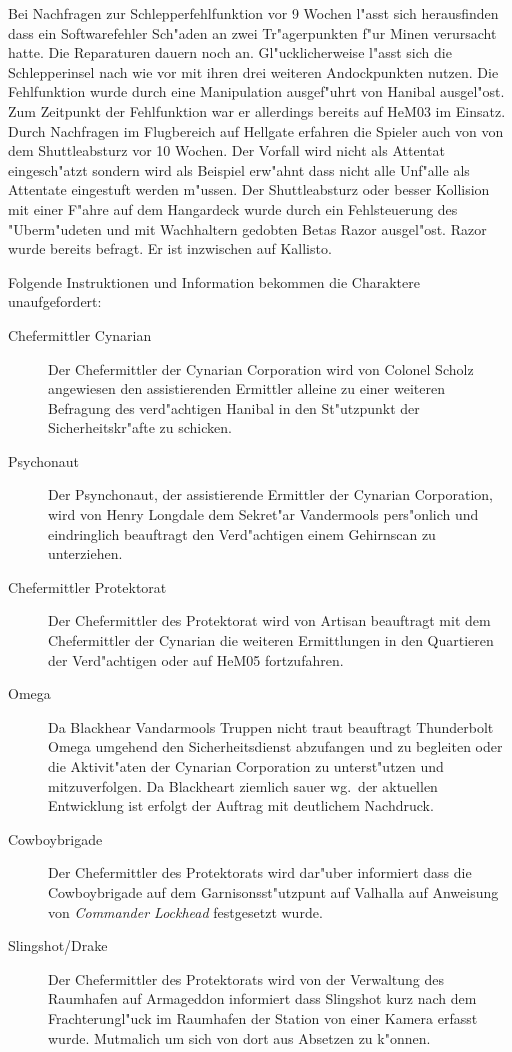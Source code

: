 Bei Nachfragen zur Schlepperfehlfunktion vor 9 Wochen l"asst sich herausfinden dass ein Softwarefehler Sch"aden an zwei Tr"agerpunkten f"ur Minen verursacht hatte. Die Reparaturen dauern noch an. Gl"ucklicherweise l"asst sich die Schlepperinsel nach wie vor mit ihren drei weiteren Andockpunkten nutzen. Die Fehlfunktion wurde durch eine Manipulation ausgef"uhrt von Hanibal ausgel"ost. Zum Zeitpunkt der Fehlfunktion war er allerdings bereits auf HeM03 im Einsatz. Durch Nachfragen im Flugbereich auf Hellgate erfahren die Spieler auch von von dem Shuttleabsturz vor 10 Wochen. Der Vorfall wird nicht als Attentat eingesch"atzt sondern wird als Beispiel erw"ahnt dass nicht alle Unf"alle als Attentate eingestuft werden m"ussen. Der Shuttleabsturz oder besser Kollision mit einer F"ahre auf dem Hangardeck wurde durch ein Fehlsteuerung des "Uberm"udeten und mit Wachhaltern gedobten Betas Razor ausgel"ost. Razor wurde bereits befragt. Er ist inzwischen auf Kallisto.

Folgende Instruktionen und Information bekommen die Charaktere unaufgefordert:

\begin{description}
	\item[Chefermittler Cynarian] Der Chefermittler der Cynarian Corporation wird von Colonel Scholz angewiesen den assistierenden Ermittler alleine zu einer weiteren Befragung des verd"achtigen Hanibal in den St"utzpunkt der Sicherheitskr"afte zu schicken.
	\item[Psychonaut] Der Psynchonaut, der assistierende Ermittler der Cynarian Corporation, wird von Henry Longdale dem Sekret"ar Vandermools pers"onlich und eindringlich beauftragt den Verd"achtigen einem Gehirnscan zu unterziehen.
	\item[Chefermittler Protektorat] Der Chefermittler des Protektorat wird von Artisan beauftragt mit dem Chefermittler der Cynarian die weiteren Ermittlungen in den Quartieren der Verd"achtigen oder auf HeM05 fortzufahren.
	\item[Omega] Da Blackhear Vandarmools Truppen nicht traut beauftragt Thunderbolt  Omega umgehend den Sicherheitsdienst abzufangen und zu begleiten oder die Aktivit"aten der Cynarian Corporation zu unterst"utzen und mitzuverfolgen. Da Blackheart ziemlich sauer wg.~der aktuellen Entwicklung ist erfolgt der Auftrag mit deutlichem Nachdruck.	
	\item[Cowboybrigade] Der Chefermittler des Protektorats wird dar"uber informiert dass die Cowboybrigade auf dem Garnisonsst"utzpunt auf Valhalla auf Anweisung von \emph{Commander Lockhead} festgesetzt wurde.
	\item[Slingshot/Drake] Der Chefermittler des Protektorats wird von der Verwaltung des Raumhafen auf Armageddon informiert dass Slingshot kurz nach dem Frachterungl"uck im Raumhafen der Station von einer Kamera erfasst wurde. Mutma\3lich um sich von dort aus Absetzen zu k"onnen.
\end{description}

